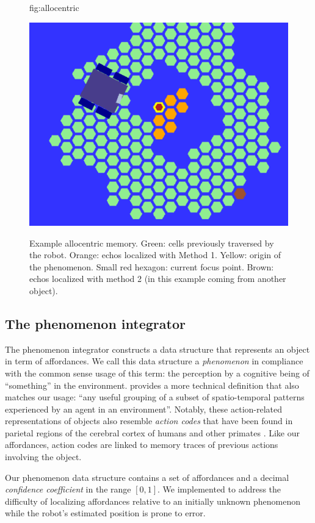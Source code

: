 \documentclass[pmlr]{jmlr}%
\begin{document}
\begin{figure}[htbp]
	\floatconts
	{fig:allocentric}
	{\caption{Example allocentric memory. 
	Green: cells previously traversed by the robot. 
	Orange: echos localized with Method 1.
	Yellow: origin of the phenomenon. 
	Small red hexagon: current focus point.
	Brown: echos localized with method 2 (in this example coming from another object).}}
	{\includegraphics[width=0.4\linewidth]{images/Figure_4_allocentric_memory}}
\end{figure}


\subsection{The phenomenon integrator}

The phenomenon integrator constructs a data structure that represents an object in term of affordances. 
We call this data structure a \textit{phenomenon} in compliance with the common sense usage of this term: the perception by a cognitive being of ``something'' in the environment.
\cite[][p. 8]{thorisson_explanation_2021} provides a more technical definition that also matches our usage: ``any useful grouping of a subset of spatio-temporal patterns experienced by an agent in an environment''.
Notably, these action-related representations of objects also resemble \textit{action codes} that have been found in parietal regions of the cerebral cortex of humans and other primates \citep{chao_representation_2000,colby_space_1999, schubotz_objects_2014}. 
Like our affordances, action codes are linked to memory traces of previous actions involving the object.

Our phenomenon data structure contains a set of affordances and a decimal \textit{confidence coefficient} in the range $[0, 1]$. 
We implemented  to address the difficulty of localizing affordances relative to an initially unknown phenomenon while the robot's estimated position is prone to error. 
\end{document}
